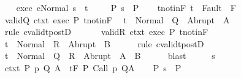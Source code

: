 \begin{isabellebody}
\ \ \isamarkupfalse%
\ exec{\isacharcolon}\ {\isachardoublequoteopen}{\isasymGamma}{\isasymturnstile}{\isasymlangle}c{\isacharcomma}Normal\ s{\isasymrangle}\ {\isasymRightarrow}\ t{\isachardoublequoteclose}\ \isanewline
\ \ \isamarkupfalse%
\ P{\isacharcolon}\ {\isachardoublequoteopen}s\ {\isasymin}\ P{\isachardoublequoteclose}\isanewline
\ \ \isamarkupfalse%
\ t{\isacharunderscore}notin{\isacharunderscore}F{\isacharcolon}\ {\isachardoublequoteopen}t\ {\isasymnotin}\ Fault\ {\isacharbackquote}\ F{\isachardoublequoteclose}\isanewline
\ \ \isamarkupfalse%
\ valid{\isacharunderscore}Q\ ctxt\ exec\ P\ t{\isacharunderscore}notin{\isacharunderscore}F\ \isamarkupfalse%
\ {\isachardoublequoteopen}t\ {\isasymin}\ Normal\ {\isacharbackquote}\ Q\ {\isasymunion}\ Abrupt\ {\isacharbackquote}\ A{\isachardoublequoteclose}\isanewline
\ \ \ \ \isamarkupfalse%
\ {\isacharparenleft}rule\ cvalidt{\isacharunderscore}postD{\isacharparenright}\isanewline
\ \ \isamarkupfalse%
\isanewline
\ \ \isamarkupfalse%
\ valid{\isacharunderscore}R\ ctxt\ exec\ P\ t{\isacharunderscore}notin{\isacharunderscore}F\ \isamarkupfalse%
\ {\isachardoublequoteopen}t\ {\isasymin}\ Normal\ {\isacharbackquote}\ R\ {\isasymunion}\ Abrupt\ {\isacharbackquote}\ B{\isachardoublequoteclose}\isanewline
\ \ \ \ \isamarkupfalse%
\ {\isacharparenleft}rule\ cvalidt{\isacharunderscore}postD{\isacharparenright}\isanewline
\ \ \isamarkupfalse%
\ \isamarkupfalse%
\ {\isachardoublequoteopen}t\ {\isasymin}\ Normal\ {\isacharbackquote}\ {\isacharparenleft}Q\ {\isasyminter}\ R{\isacharparenright}\ {\isasymunion}\ Abrupt\ {\isacharbackquote}\ {\isacharparenleft}A\ {\isasyminter}\ B{\isacharparenright}{\isachardoublequoteclose}\isanewline
\ \ \ \ \isamarkupfalse%
\ blast\isanewline
{}\isamarkupfalse%
\ \isanewline
\ \ \isamarkupfalse%
\ s\isanewline
\ \ \isamarkupfalse%
\ ctxt{\isacharcolon}\ {\isachardoublequoteopen}{\isasymforall}{\isacharparenleft}P{\isacharcomma}\ p{\isacharcomma}\ Q{\isacharcomma}\ A{\isacharparenright}{\isasymin}{\isasymTheta}{\isachardot}\ {\isasymGamma}\ {\isasymTurnstile}\isactrlsub t\isactrlbsub {\isacharslash}F\isactrlesub \ P\ {\isacharparenleft}Call\ p{\isacharparenright}\ Q{\isacharcomma}A{\isachardoublequoteclose}\isanewline
\ \ \isamarkupfalse%
\ P{\isacharcolon}\ {\isachardoublequoteopen}s\ {\isasymin}\ P{\isachardoublequoteclose}\isanewline

\end{isabellebody}
